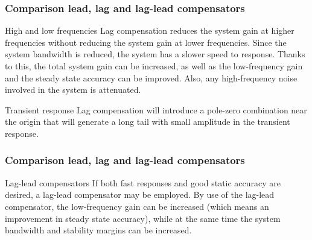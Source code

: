 \begin{frame}
	\frametitle{Comparison lead, lag and lag-lead compensators}
\begin{block}{High and low frequencies}
Lag compensation reduces the system gain at higher frequencies without reducing
the system gain at lower frequencies. Since the system bandwidth is reduced, the system has a slower speed to response. 
Thanks to this, the total system gain can be increased, as well as the low-frequency gain and the steady state accuracy can be improved. Also, any high-frequency
noise involved in the system is attenuated.
\end{block}
\begin{block}{Transient response}
Lag compensation will introduce a pole-zero combination near the origin that will
generate a long tail with small amplitude in the transient response.
\end{block}
\end{frame}

\begin{frame}
\frametitle{Comparison lead, lag and lag-lead compensators}
\begin{block}{Lag-lead compensators}
If both fast responses and good static accuracy are desired, a lag-lead compensator
may be employed. By use of the lag-lead compensator, the low-frequency gain can
be increased (which means an improvement in steady state accuracy), while at the
same time the system bandwidth and stability margins can be increased.
\end{block}
\end{frame}





